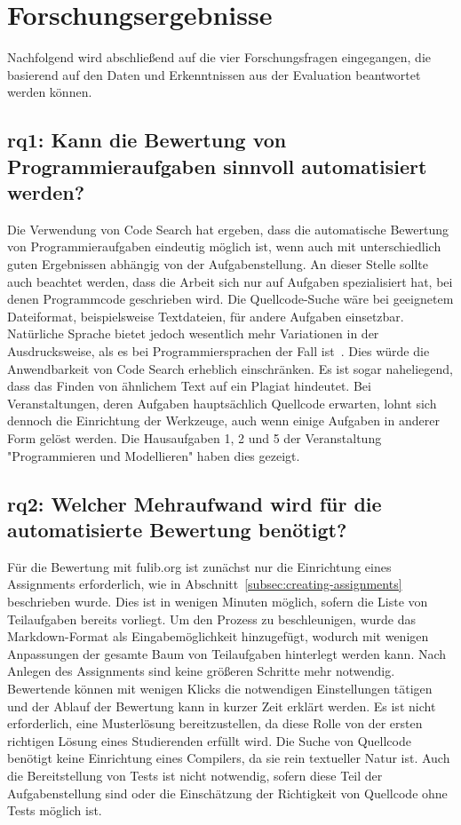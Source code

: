 \section{Forschungsergebnisse}\label{sec:research-results}

Nachfolgend wird abschließend auf die vier Forschungsfragen eingegangen, die basierend auf den Daten und Erkenntnissen aus der Evaluation beantwortet werden können.

\subsection[\acs{rq}1]{\ac{rq}1: Kann die Bewertung von Programmieraufgaben sinnvoll automatisiert werden?}\label{subsec:ra1-useful-automation}

Die Verwendung von Code Search hat ergeben, dass die automatische Bewertung von Programmieraufgaben eindeutig möglich ist, wenn auch mit unterschiedlich guten Ergebnissen abhängig von der Aufgabenstellung.
An dieser Stelle sollte auch beachtet werden, dass die Arbeit sich nur auf Aufgaben spezialisiert hat, bei denen Programmcode geschrieben wird.
Die Quellcode-Suche wäre bei geeignetem Dateiformat, beispielsweise Textdateien, für andere Aufgaben einsetzbar.
Natürliche Sprache bietet jedoch wesentlich mehr Variationen in der Ausdrucksweise, als es bei Programmiersprachen der Fall ist~\cite{satu-2016}.
Dies würde die Anwendbarkeit von Code Search erheblich einschränken.
Es ist sogar naheliegend, dass das Finden von ähnlichem Text auf ein Plagiat hindeutet.
Bei Veranstaltungen, deren Aufgaben hauptsächlich Quellcode erwarten, lohnt sich dennoch die Einrichtung der Werkzeuge, auch wenn einige Aufgaben in anderer Form gelöst werden.
Die Hausaufgaben 1, 2 und 5 der Veranstaltung "Programmieren und Modellieren" haben dies gezeigt.

\subsection[\acs{rq}2]{\ac{rq}2: Welcher Mehraufwand wird für die automatisierte Bewertung benötigt?}\label{subsec:ra2-additional-effort}

Für die Bewertung mit fulib.org ist zunächst nur die Einrichtung eines Assignments erforderlich, wie in Abschnitt~\ref{subsec:creating-assignments} beschrieben wurde.
Dies ist in wenigen Minuten möglich, sofern die Liste von Teilaufgaben bereits vorliegt.
Um den Prozess zu beschleunigen, wurde das Markdown-Format als Eingabemöglichkeit hinzugefügt, wodurch mit wenigen Anpassungen der gesamte Baum von Teilaufgaben hinterlegt werden kann.
Nach Anlegen des Assignments sind keine größeren Schritte mehr notwendig.
Bewertende können mit wenigen Klicks die notwendigen Einstellungen tätigen und der Ablauf der Bewertung kann in kurzer Zeit erklärt werden.
Es ist nicht erforderlich, eine Musterlösung bereitzustellen, da diese Rolle von der ersten richtigen Lösung eines Studierenden erfüllt wird.
Die Suche von Quellcode benötigt keine Einrichtung eines Compilers, da sie rein textueller Natur ist.
Auch die Bereitstellung von Tests ist nicht notwendig, sofern diese Teil der Aufgabenstellung sind oder die Einschätzung der Richtigkeit von Quellcode ohne Tests möglich ist.

